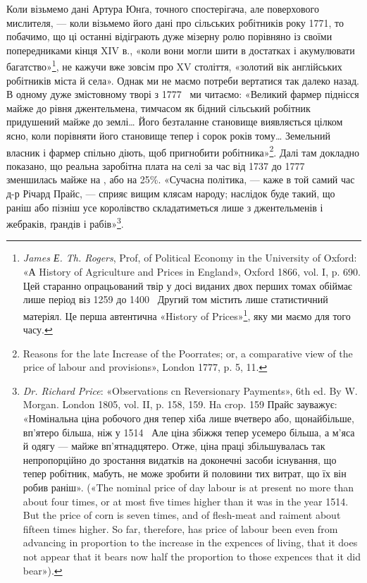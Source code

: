 Коли візьмемо дані Артура Юнґа, точного спостерігача, але
поверхового мислителя, — коли візьмемо його дані про сільських
робітників року 1771, то побачимо, що ці останні відіграють дуже
мізерну ролю порівняно із своїми попередниками кінця XIV в.,
«коли вони могли шити в достатках і акумулювати багатство»\footnote{
\emph{James Е. Th. Rogers}, Prof, of Political Economy in the University
of Oxford: «А History of Agriculture and Prices in England», Oxford
1866, vol. I, p. 690. Цей старанно опрацьований твір у досі виданих двох
перших томах обіймає лише період віз 1259 до 1400~ Другий том містить
лише статистичний матеріял. Це перша автентична «History of Prices»\footnote*{
— історія цін. \emph{Ред.}
},
яку ми маємо для того часу.
},
не кажучи вже зовсім про XV століття, «золотий вік англійських
робітників міста й села». Однак ми не маємо потреби
вертатися так далеко назад. В одному дуже змістовному творі
з 1777~ ми читаємо: «Великий фармер піднісся майже до рівня
джентельмена, тимчасом як бідний сільський робітник придушений
майже до землі\dots{} Його безталанне становище виявляється
цілком ясно, коли порівняти його становище тепер і сорок років
тому\dots{} Земельний власник і фармер спільно діють, щоб пригнобити
робітника»\footnote{
Reasons for the late Increase of the Poorrates; or, a comparative
view of the price of labour and provisions», London 1777, p. 5, 11.
}. Далі там докладно показано, що реальна
заробітна плата на селі за час від 1737 до 1777~ зменшилась
майже на ,  або на 25\%. «Сучасна політика, — каже в той самий
час д-р Річард Прайс, — сприяє вищим клясам народу; наслідок
буде такий, що раніш або пізніш усе королівство складатиметься
лише з джентельменів і жебраків, ґрандів і рабів»\footnote{
\emph{Dr. Richard Price}: «Observations cn Reversionary Payments»,
6th ed. By W. Morgan. London 1805, vol. II, p. 158, 159. Ha crop. 159
Прайс зауважує: «Номінальна ціна робочого дня тепер хіба лише вчетверо
або, щонайбільше, вп’ятеро більша, ніж у 1514~ Але ціна збіжжя тепер
усемеро більша, а м’яса й одягу — майже вп’ятнадцятеро. Отже, ціна
праці збільшувалась так непропорційно до зростання видатків на доконечні
засоби існування, що тепер робітник, мабуть, не може зробити й
половини тих витрат, що їх він робив раніш». («The nominal price of
day labour is at present no more than about four times, or at most five times
higher than it was in the year 1514. But the price of corn is seven times,
and of flesh-meat and raiment about fifteen times higher. So far, therefore,
has price of labour been even from advancing in proportion to the
increase in the expences of living, that it does not appear that it bears now
half the proportion to those expences that it did bear»).
}.

